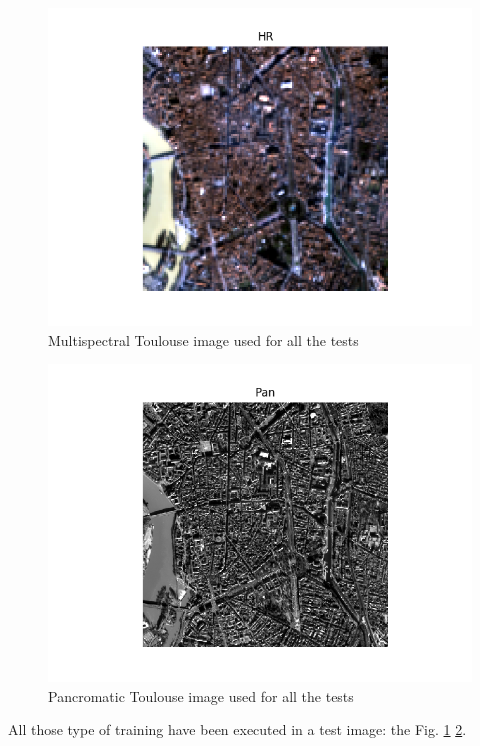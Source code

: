 \documentclass[12pt]{report}
\begin{document}
\begin{figure}[t]
    \centering
    \includegraphics[scale=.5]{toulouse.png}
    \caption{Multispectral Toulouse image used for all the tests}
    \label{fig:toulouse}
\end{figure}

\begin{figure}
    \centering
    \includegraphics[scale=.5]{toulouse_pan.png}
    \caption{Pancromatic Toulouse image used for all the tests}
    \label{fig:toulouse_pan}
\end{figure}


All those type of training have been executed in a test image: the Fig. \ref{fig:toulouse} \ref{fig:toulouse_pan}.
\end{document}

